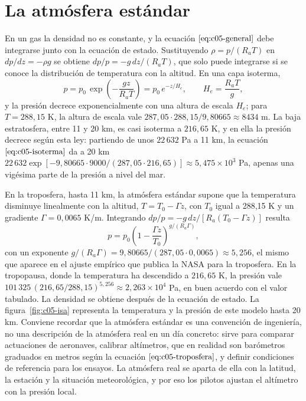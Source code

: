 \documentclass[10pt,openany]{book}
\begin{document}
\section{La atmósfera estándar}

En un gas la densidad no es constante, y la ecuación \(\eqref{eq:c05-general}\) debe integrarse junto con la ecuación de estado. Sustituyendo \(\rho = p/(R_a T)\) en \(dp/dz = -\rho g\) se obtiene \(dp/p = -g\,dz/(R_a T)\), que solo puede integrarse si se conoce la distribución de temperatura con la altitud. En una capa isoterma,
\begin{equation}
p = p_0\,\exp\!\left(-\frac{g z}{R_a T}\right) = p_0\,e^{-z/H_e}, \qquad H_e = \frac{R_a T}{g}, \label{eq:c05-isoterma}
\end{equation}
y la presión decrece exponencialmente con una altura de escala \(H_e\); para \(T = 288{,}15\) K, la altura de escala vale \(287{,}05\cdot 288{,}15/9{,}80665 \approx 8434\) m. La baja estratosfera, entre 11 y 20 km, es casi isoterma a \(216{,}65\) K, y en ella la presión decrece según esta ley: partiendo de unos \(22\,632\) Pa a 11 km, la ecuación \(\eqref{eq:c05-isoterma}\) da a 20 km \(22\,632\exp[-9{,}80665\cdot 9000/(287{,}05\cdot 216{,}65)] \approx 5{,}475\times 10^{3}\) Pa, apenas una vigésima parte de la presión a nivel del mar.

En la troposfera, hasta 11 km, la atmósfera estándar supone que la temperatura disminuye linealmente con la altitud, \(T = T_0 - \Gamma z\), con \(T_0\) igual a 288,15 K y un gradiente \(\Gamma = 0{,}0065\) K/m. Integrando \(dp/p = -g\,dz/[R_a(T_0 - \Gamma z)]\) resulta
\begin{equation}
p = p_0\left(1 - \frac{\Gamma z}{T_0}\right)^{g/(R_a\Gamma)}, \label{eq:c05-troposfera}
\end{equation}
con un exponente \(g/(R_a\Gamma) = 9{,}80665/(287{,}05\cdot 0{,}0065) \approx 5{,}256\), el mismo que aparece en el ajuste empírico que publica la NASA para la troposfera. En la tropopausa, donde la temperatura ha descendido a \(216{,}65\) K, la presión vale \(101\,325\,(216{,}65/288{,}15)^{5{,}256} \approx 2{,}263\times 10^{4}\) Pa, en buen acuerdo con el valor tabulado. La densidad se obtiene después de la ecuación de estado. La figura~\ref{fig:c05-isa} representa la temperatura y la presión de este modelo hasta 20 km. Conviene recordar que la atmósfera estándar es una convención de ingeniería, no una descripción de la atmósfera real en un día concreto: sirve para comparar actuaciones de aeronaves, calibrar altímetros, que en realidad son barómetros graduados en metros según la ecuación \(\eqref{eq:c05-troposfera}\), y definir condiciones de referencia para los ensayos. La atmósfera real se aparta de ella con la latitud, la estación y la situación meteorológica, y por eso los pilotos ajustan el altímetro con la presión local.
\end{document}
